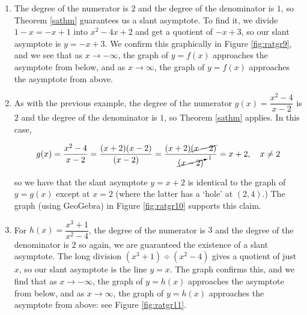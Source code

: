 {
\begin{enumerate}

\item  The degree of the numerator is $2$ and the degree of the denominator is $1$, so Theorem \ref{sathm} guarantees us a slant asymptote.  To find it, we divide $1-x = -x+1$ into $x^2-4x+2$ and get a quotient of $-x+3$, so our slant asymptote is $y=-x+3$.  We confirm this graphically in Figure \ref{fig:ratgr9}, and we see that as $x \rightarrow -\infty$, the graph of $y=f(x)$ approaches the asymptote from below, and as $x \rightarrow \infty$, the graph of $y=f(x)$ approaches the asymptote from above.



\item  As with the previous example, the degree of the numerator $g(x) = \dfrac{x^2-4}{x-2}$ is $2$ and the degree of the denominator is $1$, so Theorem \ref{sathm} applies.  In this case, 

\[ g(x) = \dfrac{x^2-4}{x-2} = \dfrac{(x+2)(x-2)}{(x-2)} = \dfrac{(x+2) \cancel{(x-2)}}{\cancelto{1}{(x-2)}} = x+2, \quad x \neq 2\]

so we have that the slant asymptote $y=x+2$ is identical to the graph of $y=g(x)$ except at $x=2$ (where the latter has a `hole' at $(2,4)$.)  The graph (using GeoGebra) in Figure \ref{fig:ratgr10} supports this claim.



\item   For $h(x) = \dfrac{x^3+1}{x^2-4}$, the degree of the numerator is $3$ and the degree of the denominator is $2$ so again, we are guaranteed the existence of a slant asymptote.  The long division $\left(x^3+1 \right) \div \left(x^2-4\right)$ gives a quotient of just $x$, so our slant asymptote is the line $y=x$.  The graph confirms this, and we find that as $x \rightarrow -\infty$, the graph of $y=h(x)$ approaches the asymptote from below, and as $x \rightarrow \infty$, the graph of $y=h(x)$ approaches the asymptote from above: see Figure \ref{fig:ratgr11}. 

\end{enumerate}
}

